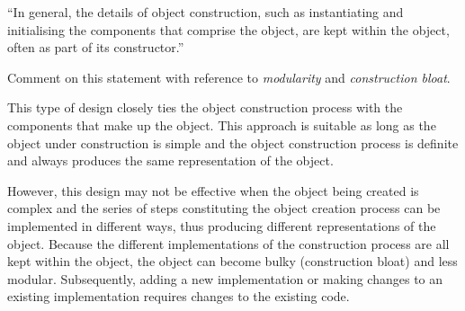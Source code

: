 \documentclass[12pt,a4paper]{exam}
\begin{document}
\begin{questions}
\question %

\noindent ``In general, the details of object construction, such as instantiating and initialising
the components that comprise the object, are kept within the object, often as part of 
its constructor.''

Comment on this statement with reference to \emph{modularity} and 
\emph{construction bloat}.

\begin{solution}
This type of design closely ties the object construction process with the 
components that make up the object. This approach is suitable as long as the 
object under construction is simple and the object construction process is 
definite and always produces the same representation of the object.

However, this design may not be effective when the object being created is 
complex and the series of steps constituting the object creation process can be 
implemented in different ways, thus producing different representations of the object. 
Because the different implementations of the construction process are all kept within the 
object, the object can become bulky (construction bloat) and less modular. Subsequently, 
adding a new implementation or making changes to an existing implementation 
requires changes to the existing code.
\end{solution}

\question %
\end{questions}
\end{document}
